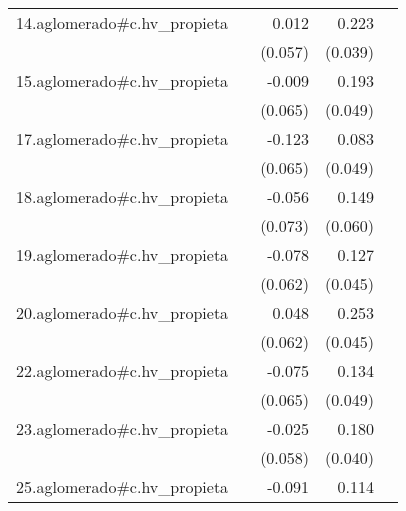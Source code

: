 {\begin{longtable}{l*{4}{D{.}{.}{-1}}}
\addlinespace
14.aglomerado#c.hv\_propieta&                     &       0.012         &       0.223\sym{***}&                     \\
            &                     &     (0.057)         &     (0.039)         &                     \\
\addlinespace
15.aglomerado#c.hv\_propieta&                     &      -0.009         &       0.193\sym{***}&                     \\
            &                     &     (0.065)         &     (0.049)         &                     \\
\addlinespace
17.aglomerado#c.hv\_propieta&                     &      -0.123         &       0.083         &                     \\
            &                     &     (0.065)         &     (0.049)         &                     \\
\addlinespace
18.aglomerado#c.hv\_propieta&                     &      -0.056         &       0.149\sym{*}  &                     \\
            &                     &     (0.073)         &     (0.060)         &                     \\
\addlinespace
19.aglomerado#c.hv\_propieta&                     &      -0.078         &       0.127\sym{**} &                     \\
            &                     &     (0.062)         &     (0.045)         &                     \\
\addlinespace
20.aglomerado#c.hv\_propieta&                     &       0.048         &       0.253\sym{***}&                     \\
            &                     &     (0.062)         &     (0.045)         &                     \\
\addlinespace
22.aglomerado#c.hv\_propieta&                     &      -0.075         &       0.134\sym{**} &                     \\
            &                     &     (0.065)         &     (0.049)         &                     \\
\addlinespace
23.aglomerado#c.hv\_propieta&                     &      -0.025         &       0.180\sym{***}&                     \\
            &                     &     (0.058)         &     (0.040)         &                     \\
\addlinespace
25.aglomerado#c.hv\_propieta&                     &      -0.091         &       0.114\sym{*}  &                     \\

\end{longtable}}
